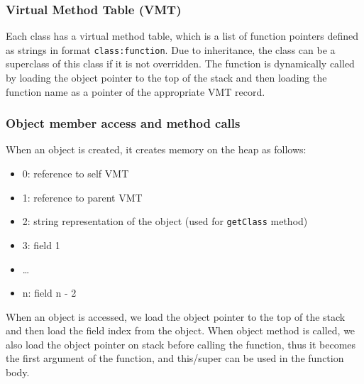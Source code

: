 \documentclass[a4paper,11pt]{article}
\begin{document}
                \subsubsection{Virtual Method Table (VMT)}
                    Each class has a virtual method table, which is a list of function pointers defined as strings in format \texttt{class:function}.
                    Due to inheritance, the class can be a superclass of this class if it is not overridden.
                    The function is dynamically called by loading the object pointer to the top of the stack and then loading the function name as a pointer of the appropriate VMT record.


                \subsubsection{Object member access and method calls}
                    When an object is created, it creates memory on the heap as follows:
                    \begin{itemize}
                        \item 0: reference to self VMT
                        \item 1: reference to parent VMT
                        \item 2: string representation of the object (used for \texttt{getClass} method)
                        \item 3: field 1
                        \item \ldots
                        \item n: field n - 2
                    \end{itemize}
                    When an object is accessed, we load the object pointer to the top of the stack and then load the field index from the object.
                    When object method is called, we also load the object pointer on stack before calling the function,
                    thus it becomes the first argument of the function, and this/super can be used in the function body.
\end{document}
